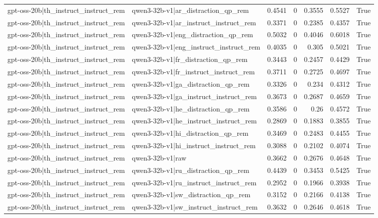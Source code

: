 \begin{table}
\begin{tabular}{l l r r r r l}
gpt-oss-20b|th_instruct_instruct_rem & qwen3-32b-v1|ar_distraction_qp_rem & 0.4541 & 0 & 0.3555 & 0.5527 & True \\
gpt-oss-20b|th_instruct_instruct_rem & qwen3-32b-v1|ar_instruct_instruct_rem & 0.3371 & 0 & 0.2385 & 0.4357 & True \\
gpt-oss-20b|th_instruct_instruct_rem & qwen3-32b-v1|eng_distraction_qp_rem & 0.5032 & 0 & 0.4046 & 0.6018 & True \\
gpt-oss-20b|th_instruct_instruct_rem & qwen3-32b-v1|eng_instruct_instruct_rem & 0.4035 & 0 & 0.305 & 0.5021 & True \\
gpt-oss-20b|th_instruct_instruct_rem & qwen3-32b-v1|fr_distraction_qp_rem & 0.3443 & 0 & 0.2457 & 0.4429 & True \\
gpt-oss-20b|th_instruct_instruct_rem & qwen3-32b-v1|fr_instruct_instruct_rem & 0.3711 & 0 & 0.2725 & 0.4697 & True \\
gpt-oss-20b|th_instruct_instruct_rem & qwen3-32b-v1|ga_distraction_qp_rem & 0.3326 & 0 & 0.234 & 0.4312 & True \\
gpt-oss-20b|th_instruct_instruct_rem & qwen3-32b-v1|ga_instruct_instruct_rem & 0.3673 & 0 & 0.2687 & 0.4659 & True \\
gpt-oss-20b|th_instruct_instruct_rem & qwen3-32b-v1|he_distraction_qp_rem & 0.3586 & 0 & 0.26 & 0.4572 & True \\
gpt-oss-20b|th_instruct_instruct_rem & qwen3-32b-v1|he_instruct_instruct_rem & 0.2869 & 0 & 0.1883 & 0.3855 & True \\
gpt-oss-20b|th_instruct_instruct_rem & qwen3-32b-v1|hi_distraction_qp_rem & 0.3469 & 0 & 0.2483 & 0.4455 & True \\
gpt-oss-20b|th_instruct_instruct_rem & qwen3-32b-v1|hi_instruct_instruct_rem & 0.3088 & 0 & 0.2102 & 0.4074 & True \\
gpt-oss-20b|th_instruct_instruct_rem & qwen3-32b-v1|raw & 0.3662 & 0 & 0.2676 & 0.4648 & True \\
gpt-oss-20b|th_instruct_instruct_rem & qwen3-32b-v1|ru_distraction_qp_rem & 0.4439 & 0 & 0.3453 & 0.5425 & True \\
gpt-oss-20b|th_instruct_instruct_rem & qwen3-32b-v1|ru_instruct_instruct_rem & 0.2952 & 0 & 0.1966 & 0.3938 & True \\
gpt-oss-20b|th_instruct_instruct_rem & qwen3-32b-v1|sw_distraction_qp_rem & 0.3152 & 0 & 0.2166 & 0.4138 & True \\
gpt-oss-20b|th_instruct_instruct_rem & qwen3-32b-v1|sw_instruct_instruct_rem & 0.3632 & 0 & 0.2646 & 0.4618 & True \\

\end{tabular}
\end{table}

